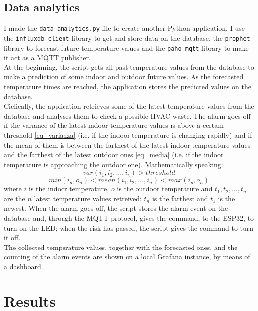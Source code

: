 \documentclass[conference]{IEEEtran}
\begin{document}
\subsection{Data analytics}
I made the \texttt{data\_analytics.py} file to create another Python application. I use the \texttt{influxdb-client} library to get and store data on the database, the \texttt{prophet} library to forecast future temperature values and the \texttt{paho-mqtt} library to make it act as a MQTT publisher.\\
At the beginning, the script gets all past temperature values from the database to make a prediction of some indoor and outdoor future values. As the forecasted temperature times are reached, the application stores the predicted values on the database.\\
Ciclically, the application retrieves some of the latest temperature values from the database and analyses them to check a possible HVAC waste. The alarm goes off if the variance of the latest indoor temperature values is above a certain threshold \eqref{eq_varianza} (i.e. if the indoor temperature is changing rapidly) and if the mean of them is between the farthest of the latest indoor temperature values and the farthest of the latest outdoor ones \eqref{eq_media} (i.e. if the indoor temperature is approaching the outdoor one). Mathematically speaking:
\begin{equation}
var(i_1, i_2, \dots, i_n) > threshold \label{eq_varianza}
\end{equation}
\begin{equation}
min(i_n, o_n) < mean(i_1, i_2, \dots, i_n) < max(i_n, o_n) \label{eq_media}
\end{equation}
where $i$ is the indoor temperature, $o$ is the outdoor temperature and $t_1, t_2, \dots, t_n$ are the $n$ latest temperature values retreived: $t_n$ is the farthest and $t_1$ is the newest. When the alarm goes off, the script stores the alarm event on the database and, through the MQTT protocol, gives the command, to the ESP32, to turn on the LED; when the risk has passed, the script gives the command to turn it off.\\
The collected temperature values, together with the forecasted ones, and the counting of the alarm events are shown on a local Grafana instance, by means of a dashboard.


\section{Results}
\end{document}
